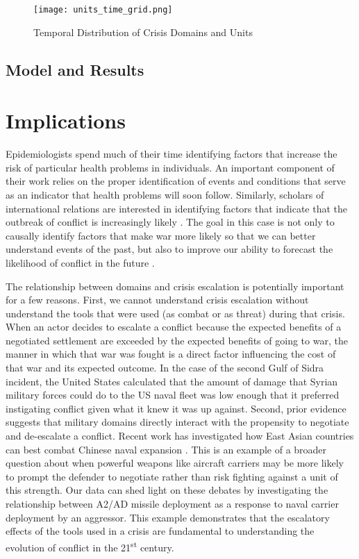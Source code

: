 \documentclass[12pt,letterpaper]{article}
\begin{document}
		\begin{figure}[H]
			\centering
			\texttt{[image: units\_time\_grid.png]}
			\caption{Temporal Distribution of Crisis Domains and Units}
			\label{fig:summary_timeseries}
		\end{figure}
	
	\subsection{Model and Results}

\section{Implications}
	Epidemiologists spend much of their time identifying factors that increase the risk of particular health problems in individuals. An important component of their work relies on the proper identification of events and conditions that serve as an indicator that health problems will soon follow. Similarly, scholars of international relations are interested in identifying factors that indicate that the outbreak of conflict is increasingly likely \citep{senese_stepswarempirical_2008}. The goal in this case is not only to causally identify factors that make war more likely so that we can better understand events of the past, but also to improve our ability to forecast the likelihood of conflict in the future \citep{valeriano_pathwaysinterstatewar_2010}.
	
	The relationship between domains and crisis escalation is potentially important for a few reasons. First, we cannot understand crisis escalation without understand the tools that were used (as combat or as threat) during that crisis. When an actor decides to escalate a conflict because the expected benefits of a negotiated settlement are exceeded by the expected benefits of going to war, the manner in which that war was fought is a direct factor influencing the cost of that war and its expected outcome. In the case of the second Gulf of Sidra incident, the United States calculated that the amount of damage that Syrian military forces could do to the US naval fleet was low enough that it preferred instigating conflict given what it knew it was up against. Second, prior evidence suggests that military domains directly interact with the propensity to negotiate and de-escalate a conflict. Recent work has investigated how East Asian countries can best combat Chinese naval expansion \citep{beckley_emergingmilitarybalance_2017}. This is an example of a broader question about when powerful weapons like aircraft carriers may be more likely to prompt the defender to negotiate rather than risk fighting against a unit of this strength. Our data can shed light on these debates by investigating the relationship between A2/AD missile deployment as a response to naval carrier deployment by an aggressor. This example demonstrates that the escalatory effects of the tools used in a crisis are fundamental to understanding the evolution of conflict in the 21\textsuperscript{st} century.
	
\end{document}
